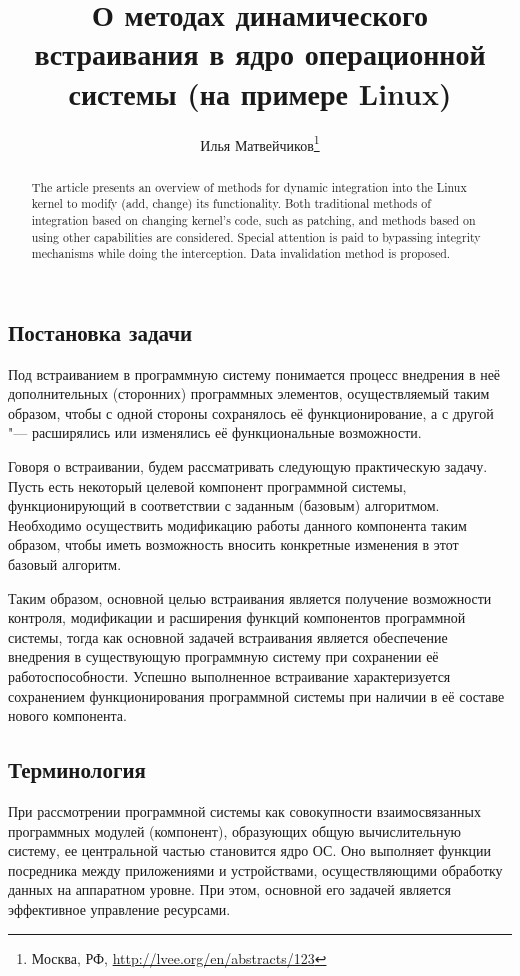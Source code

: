 \documentclass[10pt, a5paper]{article}
\begin{document}
\title{О методах динамического встраивания в ядро операционной системы (на примере Linux)}
\author{Илья Матвейчиков\footnote{Москва, РФ, \url{http://lvee.org/en/abstracts/123}}}
\maketitle
\begin{abstract}
The article presents an overview of methods for dynamic integration into the Linux kernel to modify (add, change) its functionality. Both traditional methods of integration based on changing kernel's code, such as patching, and methods based on using other capabilities are considered. Special attention is paid to bypassing integrity mechanisms while doing the interception. Data invalidation method is proposed.
\end{abstract}
\subsection*{Постановка задачи}

Под встраиванием в программную систему понимается процесс внедрения в неё дополнительных (сторонних) программных элементов, осуществляемый таким образом, чтобы с одной стороны сохранялось её функционирование, а с другой "--- расширялись или изменялись её функциональные возможности.

Говоря о встраивании, будем рассматривать следующую практическую задачу. Пусть есть некоторый целевой компонент программной системы, функционирующий в соответствии с заданным (базовым) алгоритмом. Необходимо осуществить модификацию работы данного компонента таким образом, чтобы иметь возможность вносить конкретные изменения в этот базовый алгоритм.

Таким образом, основной целью встраивания является получение возможности контроля, модификации и расширения функций компонентов программной системы, тогда как основной задачей встраивания является обеспечение внедрения в существующую программную систему при сохранении её работоспособности. Успешно выполненное встраивание характеризуется сохранением функционирования программной системы при наличии в её составе нового компонента.

\subsection*{Терминология}

При рассмотрении программной системы как совокупности взаимосвязанных программных модулей (компонент), образующих общую вычислительную систему, ее центральной частью становится ядро ОС. Оно выполняет функции посредника между приложениями и устройствами, осуществляющими обработку данных на аппаратном уровне. При этом, основной его задачей является эффективное управление ресурсами.
\end{document}

